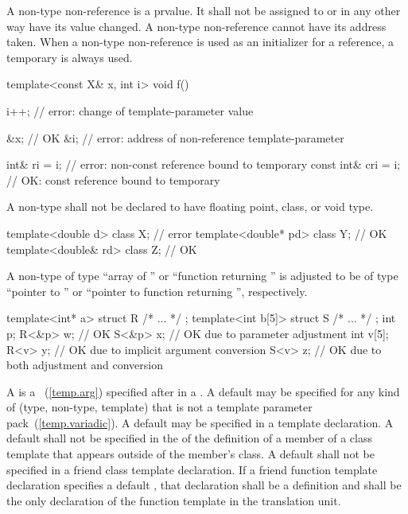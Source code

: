 \pnum
A non-type non-reference
is a prvalue.
It shall not be assigned to or in any other way have its value changed.
A non-type non-reference
cannot have its address taken.
When a non-type non-reference
is used as an initializer for a reference, a temporary is always used.
\enterexample

\begin{codeblock}
template<const X& x, int i> void f() {
  i++;                          // error: change of template-parameter value

  &x;                           // OK
  &i;                           // error: address of non-reference template-parameter

  int& ri = i;                  // error: non-const reference bound to temporary
  const int& cri = i;           // OK: const reference bound to temporary
}
\end{codeblock}
\exitexample

\pnum
A non-type
shall not be declared to have floating point, class, or void type.
\enterexample

\begin{codeblock}
template<double d> class X;     // error
template<double* pd> class Y;   // OK
template<double& rd> class Z;   // OK
\end{codeblock}
\exitexample

\pnum
A non-type
of type ``array of
''
or ``function returning
''
is adjusted to be of type
``pointer to
''
or ``pointer to function returning
'',
respectively.
\enterexample

\begin{codeblock}
template<int* a>   struct R { /* ... */ };
template<int b[5]> struct S { /* ... */ };
int p;
R<&p> w;                        // OK
S<&p> x;                        // OK due to parameter adjustment
int v[5];
R<v> y;                         // OK due to implicit argument conversion
S<v> z;                         // OK due to both adjustment and conversion
\end{codeblock}
\exitexample

\pnum
A
is a
~(\ref{temp.arg}) specified after
\tcode{=}
in a
.
A default
may be specified for any kind of
(type, non-type, template)
that is not a template parameter pack~(\ref{temp.variadic}).
A default
may be specified in a template declaration.
A default
shall not be specified in the
of the definition of a member of a class template that appears outside
of the member's class.
A default
shall not be specified in a friend class template declaration.
If a friend function template declaration
specifies a default
,
that declaration shall be a definition and shall be the only declaration of
the function template in the translation unit.

